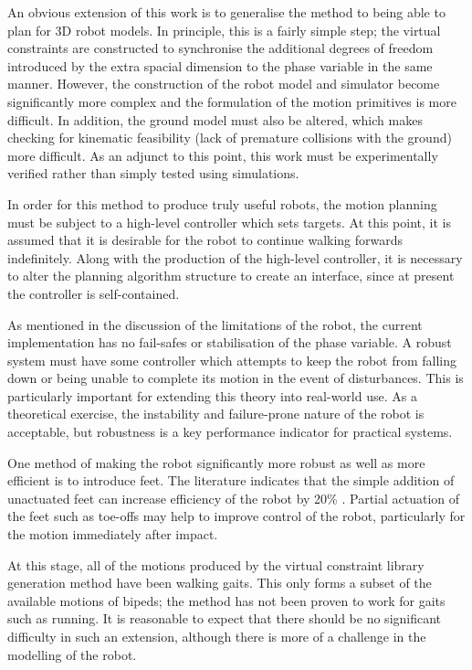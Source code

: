 An obvious extension of this work is to generalise the method to being able to plan for 3D robot models. In principle, this is a fairly simple step; the virtual constraints are constructed to synchronise the additional degrees of freedom introduced by the extra spacial dimension to the phase variable in the same manner. However, the construction of the robot model and simulator become significantly more complex and the formulation of the motion primitives is more difficult. In addition, the ground model must also be altered, which makes checking for kinematic feasibility (lack of premature collisions with the ground) more difficult. As an adjunct to this point, this work must be experimentally verified rather than simply tested using simulations.

In order for this method to produce truly useful robots, the motion planning must be subject to a high-level controller which sets targets. At this point, it is assumed that it is desirable for the robot to continue walking forwards indefinitely. Along with the production of the high-level controller, it is necessary to alter the planning algorithm structure to create an interface, since at present the controller is self-contained.

As mentioned in the discussion of the limitations of the robot, the current implementation has no fail-safes or stabilisation of the phase variable. A robust system must have some controller which attempts to keep the robot from falling down or being unable to complete its motion in the event of disturbances. This is particularly important for extending this theory into real-world use. As a theoretical exercise, the instability and failure-prone nature of the robot is acceptable, but robustness is a key performance indicator for practical systems.

One method of making the robot significantly more robust as well as more efficient is to introduce feet. The literature indicates that the simple addition of unactuated feet can increase efficiency of the robot by 20\% \cite{asano2007dynamic}. Partial actuation of the feet such as toe-offs may help to improve control of the robot, particularly for the motion immediately after impact.

At this stage, all of the motions produced by the virtual constraint library generation method have been walking gaits. This only forms a subset of the available motions of bipeds; the method has not been proven to work for gaits such as running. It is reasonable to expect that there should be no significant difficulty in such an extension, although there is more of a challenge in the modelling of the robot.


